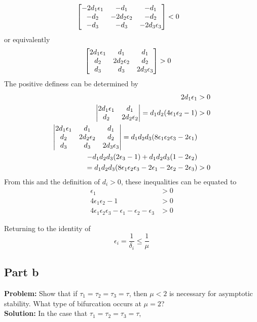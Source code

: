 \documentclass[letter]{article}
\begin{document}
\begin{align}
	\mqty[-2 d_1\epsilon_1 & -d_1 &-d_1\\
	-d_2 &-2 d_2\epsilon_2 &-d_2\\
	-d_3	&-d_3	&-2 d_3\epsilon_3]
	&< 0
\end{align}
or equivalently
\begin{align}
	\mqty[2 d_1\epsilon_1 & d_1 &d_1\\
	d_2 &2 d_2\epsilon_2 &d_2\\
	d_3	&d_3	&2 d_3\epsilon_3]
	&> 0
\end{align}
The positive definess can be determined by
\begin{align}
	2 d_1 \epsilon_1 &>0\\
	\mqty|2 d_1\epsilon_1 & d_1\\
	d_2 &2 d_2\epsilon_2| = d_1 d_2 (4 \epsilon_1 \epsilon_2 - 1) &> 0\\
	\mqty|2 d_1\epsilon_1 & d_1 &d_1\\
	d_2 &2 d_2\epsilon_2 &d_2\\
	d_3	&d_3	&2 d_3\epsilon_3|
	= d_1 d_2 d_3  (8 \epsilon_1 \epsilon_2 \epsilon_3 - 2 \epsilon_1)\nonumber\\
	- d_1 d_2 d_3(2 \epsilon_3 - 1)
	+ d_1 d_2 d_3 (1 - 2\epsilon_2)\nonumber\\
	= d_1 d_2 d_3 (8 \epsilon_1 \epsilon_2 \epsilon_3 
	- 2 \epsilon_1
	- 2 \epsilon_2
	- 2 \epsilon_3)
	&>0
\end{align}
From this and the definition of $d_i > 0$, these inequalities can be equated to
\begin{align}
	\epsilon_1&>0\\
	4 \epsilon_1 \epsilon_2 -1 &>0\\
	4 \epsilon_1 \epsilon_2 \epsilon_3 - \epsilon_1 - \epsilon_2 - \epsilon_3 &> 0	
\end{align}


Returning to the identity of $$\epsilon_i = \frac{1}{\delta_i} \leq \frac{1}{\mu}$$



\newpage
\subsection{Part b}
\textbf{Problem:}
Show that if $\tau_1 = \tau_2 = \tau_3 = \tau$, then $\mu <2$ is necessary for asymptotic stability. What type of bifurcation occurs at $\mu = 2$?\\

\noindent
\textbf{Solution:}
In the case that  $\tau_1 = \tau_2 = \tau_3 = \tau$, 
\end{document}
